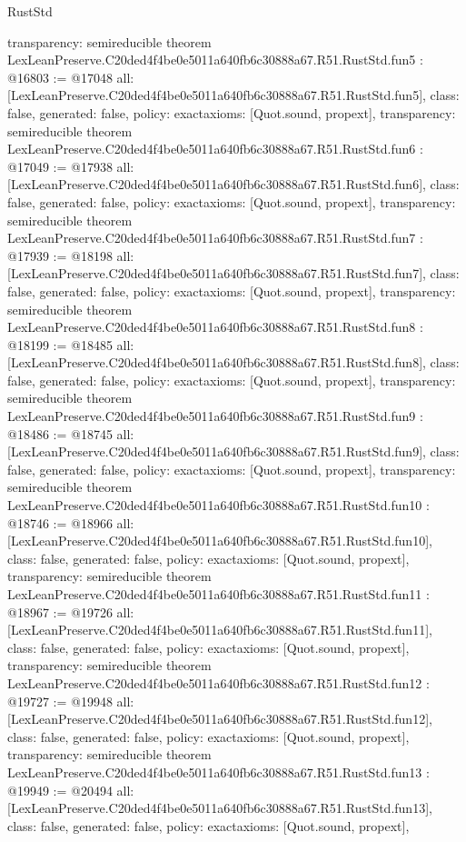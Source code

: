 \begin{lexlean}{RustStd}
\begin{coremodule}
{  transparency: semireducible
}
theorem LexLeanPreserve.C20ded4f4be0e5011a640fb6c30888a67.R51.RustStd.fun5 : @16803 := @17048 {
  all: [LexLeanPreserve.C20ded4f4be0e5011a640fb6c30888a67.R51.RustStd.fun5],
  class: false,
  generated: false,
  policy: exact{axioms: [Quot.sound, propext]},
  transparency: semireducible
}
theorem LexLeanPreserve.C20ded4f4be0e5011a640fb6c30888a67.R51.RustStd.fun6 : @17049 := @17938 {
  all: [LexLeanPreserve.C20ded4f4be0e5011a640fb6c30888a67.R51.RustStd.fun6],
  class: false,
  generated: false,
  policy: exact{axioms: [Quot.sound, propext]},
  transparency: semireducible
}
theorem LexLeanPreserve.C20ded4f4be0e5011a640fb6c30888a67.R51.RustStd.fun7 : @17939 := @18198 {
  all: [LexLeanPreserve.C20ded4f4be0e5011a640fb6c30888a67.R51.RustStd.fun7],
  class: false,
  generated: false,
  policy: exact{axioms: [Quot.sound, propext]},
  transparency: semireducible
}
theorem LexLeanPreserve.C20ded4f4be0e5011a640fb6c30888a67.R51.RustStd.fun8 : @18199 := @18485 {
  all: [LexLeanPreserve.C20ded4f4be0e5011a640fb6c30888a67.R51.RustStd.fun8],
  class: false,
  generated: false,
  policy: exact{axioms: [Quot.sound, propext]},
  transparency: semireducible
}
theorem LexLeanPreserve.C20ded4f4be0e5011a640fb6c30888a67.R51.RustStd.fun9 : @18486 := @18745 {
  all: [LexLeanPreserve.C20ded4f4be0e5011a640fb6c30888a67.R51.RustStd.fun9],
  class: false,
  generated: false,
  policy: exact{axioms: [Quot.sound, propext]},
  transparency: semireducible
}
theorem LexLeanPreserve.C20ded4f4be0e5011a640fb6c30888a67.R51.RustStd.fun10 : @18746 := @18966 {
  all: [LexLeanPreserve.C20ded4f4be0e5011a640fb6c30888a67.R51.RustStd.fun10],
  class: false,
  generated: false,
  policy: exact{axioms: [Quot.sound, propext]},
  transparency: semireducible
}
theorem LexLeanPreserve.C20ded4f4be0e5011a640fb6c30888a67.R51.RustStd.fun11 : @18967 := @19726 {
  all: [LexLeanPreserve.C20ded4f4be0e5011a640fb6c30888a67.R51.RustStd.fun11],
  class: false,
  generated: false,
  policy: exact{axioms: [Quot.sound, propext]},
  transparency: semireducible
}
theorem LexLeanPreserve.C20ded4f4be0e5011a640fb6c30888a67.R51.RustStd.fun12 : @19727 := @19948 {
  all: [LexLeanPreserve.C20ded4f4be0e5011a640fb6c30888a67.R51.RustStd.fun12],
  class: false,
  generated: false,
  policy: exact{axioms: [Quot.sound, propext]},
  transparency: semireducible
}
theorem LexLeanPreserve.C20ded4f4be0e5011a640fb6c30888a67.R51.RustStd.fun13 : @19949 := @20494 {
  all: [LexLeanPreserve.C20ded4f4be0e5011a640fb6c30888a67.R51.RustStd.fun13],
  class: false,
  generated: false,
  policy: exact{axioms: [Quot.sound, propext]},
}
\end{coremodule}
\end{lexlean}
